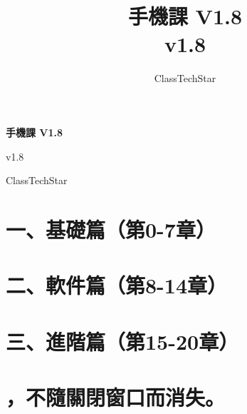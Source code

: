 \documentclass[11pt,a4paper,openany]{book}
\title{手機課 V1.8\\ \large v1.8}
\author{ClassTechStar}
\date{}
\begin{document}
\begin{titlepage}
\centering
\vspace*{0.28\textheight}
{\Huge\bfseries 手機課 V1.8\par}
\vspace{1.2em}
{\Large v1.8\par}
\vfill
{\large ClassTechStar\par}
\end{titlepage}
\frontmatter
\tableofcontents
\mainmatter
\part*{一、基礎篇（第0-7章）}










\part*{二、軟件篇（第8-14章）}








\part*{三、進階篇（第15-20章）}







\part*{，不隨關閉窗口而消失。}







\end{document}
